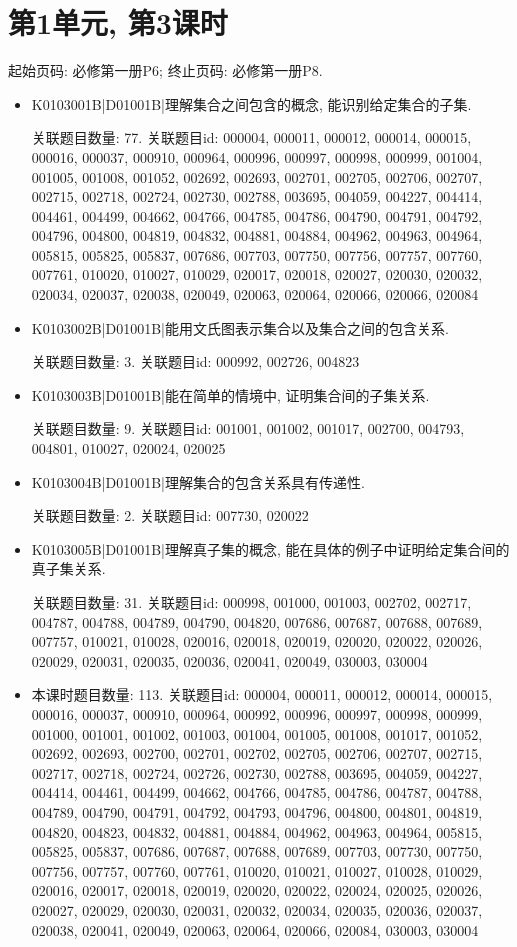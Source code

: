 \section*{第1单元, 第3课时}
起始页码: 必修第一册P6; 终止页码: 必修第一册P8.
\begin{itemize}
\item K0103001B|D01001B|理解集合之间包含的概念, 能识别给定集合的子集.

关联题目数量: 77. 关联题目id: 000004, 000011, 000012, 000014, 000015, 000016, 000037, 000910, 000964, 000996, 000997, 000998, 000999, 001004, 001005, 001008, 001052, 002692, 002693, 002701, 002705, 002706, 002707, 002715, 002718, 002724, 002730, 002788, 003695, 004059, 004227, 004414, 004461, 004499, 004662, 004766, 004785, 004786, 004790, 004791, 004792, 004796, 004800, 004819, 004832, 004881, 004884, 004962, 004963, 004964, 005815, 005825, 005837, 007686, 007703, 007750, 007756, 007757, 007760, 007761, 010020, 010027, 010029, 020017, 020018, 020027, 020030, 020032, 020034, 020037, 020038, 020049, 020063, 020064, 020066, 020066, 020084

\item K0103002B|D01001B|能用文氏图表示集合以及集合之间的包含关系.

关联题目数量: 3. 关联题目id: 000992, 002726, 004823

\item K0103003B|D01001B|能在简单的情境中, 证明集合间的子集关系.

关联题目数量: 9. 关联题目id: 001001, 001002, 001017, 002700, 004793, 004801, 010027, 020024, 020025

\item K0103004B|D01001B|理解集合的包含关系具有传递性.

关联题目数量: 2. 关联题目id: 007730, 020022

\item K0103005B|D01001B|理解真子集的概念, 能在具体的例子中证明给定集合间的真子集关系.

关联题目数量: 31. 关联题目id: 000998, 001000, 001003, 002702, 002717, 004787, 004788, 004789, 004790, 004820, 007686, 007687, 007688, 007689, 007757, 010021, 010028, 020016, 020018, 020019, 020020, 020022, 020026, 020029, 020031, 020035, 020036, 020041, 020049, 030003, 030004

\item 本课时题目数量: 113. 关联题目id: 000004, 000011, 000012, 000014, 000015, 000016, 000037, 000910, 000964, 000992, 000996, 000997, 000998, 000999, 001000, 001001, 001002, 001003, 001004, 001005, 001008, 001017, 001052, 002692, 002693, 002700, 002701, 002702, 002705, 002706, 002707, 002715, 002717, 002718, 002724, 002726, 002730, 002788, 003695, 004059, 004227, 004414, 004461, 004499, 004662, 004766, 004785, 004786, 004787, 004788, 004789, 004790, 004791, 004792, 004793, 004796, 004800, 004801, 004819, 004820, 004823, 004832, 004881, 004884, 004962, 004963, 004964, 005815, 005825, 005837, 007686, 007687, 007688, 007689, 007703, 007730, 007750, 007756, 007757, 007760, 007761, 010020, 010021, 010027, 010028, 010029, 020016, 020017, 020018, 020019, 020020, 020022, 020024, 020025, 020026, 020027, 020029, 020030, 020031, 020032, 020034, 020035, 020036, 020037, 020038, 020041, 020049, 020063, 020064, 020066, 020084, 030003, 030004


\end{itemize}
